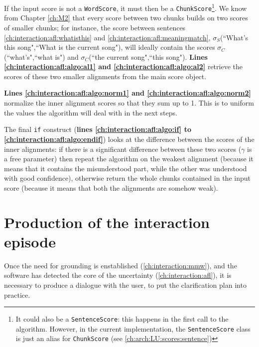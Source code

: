 If the input score is not a \texttt{WordScore}, it must then be a \texttt{ChunkScore}\footnote{It could also be a \texttt{SentenceScore}: this happens in the first call to the algorithm. However, in the current implementation, the \texttt{SentenceScore} class is just an alias for \texttt{ChunkScore} (see \ref{ch:arch:LU:scores:sentence})}. We know from Chapter \ref{ch:M2} that every score between two chunks builds on two scores of smaller chunks; for instance, the score between sentences \ref{ch:interaction:afl:whatisthis} and \ref{ch:interaction:afl:meaningmatch}, $\sigma_S$(``What's this song",``What is the current song"), will ideally contain the scores $\sigma_C$(``what's",``what is") and $\sigma_C$(``the current song",``this song"). \textbf{Lines \ref{ch:interaction:afl:algo:al1} and \ref{ch:interaction:afl:algo:al2}} retrieve the scores of these two smaller alignments from the main score object.

\textbf{Lines \ref{ch:interaction:afl:algo:norm1} and \ref{ch:interaction:afl:algo:norm2}} normalize the inner alignment scores so that they sum up to 1. This is to uniform the values the algorithm will deal with in the next steps.

The final \texttt{if} construct (\textbf{lines \ref{ch:interaction:afl:algo:if} to \ref{ch:interaction:afl:algo:endif}}) looks at the difference between the scores of the inner alignments: if there is a significant difference between these two scores ($\gamma$ is a free parameter) then repeat the algorithm on the weakest alignment (because it means that it contains the misunderstood part, while the other was understood with good confidence), otherwise return the whole chunks contained in the input score (because it means that both the alignments are somehow weak).


\section{Production of the interaction episode} \label{ch:interaction:episode}
Once the need for grounding is enstablished (\ref{ch:interaction:mmw}), and the software has detected the core of the uncertainty (\ref{ch:interaction:afl}), it is necessary to produce a dialogue with the user, to put the clarification plan into practice.

